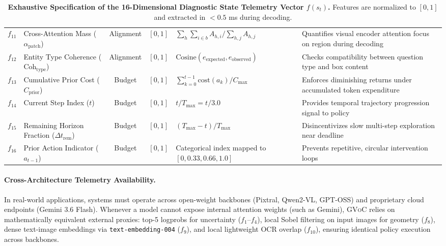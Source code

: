 \documentclass[11pt]{article}
\begin{document}
\begin{table}[t]
{\begin{tabular}{clccll}
$f_{11}$ & Cross-Attention Mass ($\alpha_{\text{patch}}$) & Alignment & $[0, 1]$ & $\sum_h \sum_{i \in b} A_{h,i} / \sum_{h,j} A_{h,j}$ & Quantifies visual encoder attention focus on region during decoding \\
$f_{12}$ & Entity Type Coherence ($\text{Coh}_{\text{type}}$) & Alignment & $[0, 1]$ & $\text{Cosine}(e_{\text{expected}}, e_{\text{observed}})$ & Checks compatibility between question type and box content \\
\midrule
$f_{13}$ & Cumulative Prior Cost ($C_{\text{prior}}$) & Budget & $[0, 1]$ & $\sum_{k=0}^{t-1} \text{cost}(a_k) / C_{\max}$ & Enforces diminishing returns under accumulated token expenditure \\
$f_{14}$ & Current Step Index ($t$) & Budget & $[0, 1]$ & $t / T_{\max} = t / 3.0$ & Provides temporal trajectory progression signal to policy \\
$f_{15}$ & Remaining Horizon Fraction ($\Delta t_{\text{rem}}$) & Budget & $[0, 1]$ & $(T_{\max} - t) / T_{\max}$ & Disincentivizes slow multi-step exploration near deadline \\
$f_{16}$ & Prior Action Indicator ($a_{t-1}$) & Budget & $[0, 1]$ & Categorical index mapped to $[0, 0.33, 0.66, 1.0]$ & Prevents repetitive, circular intervention loops \\
\bottomrule
\end{tabular}
}
\vspace{-2mm}
\caption{\textbf{Exhaustive Specification of the 16-Dimensional Diagnostic State Telemetry Vector $f(s_t)$.} Features are normalized to $[0, 1]$ and extracted in $< 0.5$ ms during decoding.}
\label{tab:telemetry_full}
\end{table}

\paragraph{Cross-Architecture Telemetry Availability.}
In real-world applications, systems must operate across open-weight backbones (Pixtral, Qwen2-VL, GPT-OSS) and proprietary cloud endpoints (Gemini 3.6 Flash). Whenever a model cannot expose internal attention weights (such as Gemini), \textsc{GVoC} relies on mathematically equivalent external proxies: top-5 logprobs for uncertainty ($f_1$--$f_4$), local Sobel filtering on input images for geometry ($f_8$), dense text-image embeddings via \texttt{text-embedding-004} ($f_9$), and local lightweight OCR overlap ($f_{10}$), ensuring identical policy execution across backbones.
\end{document}
